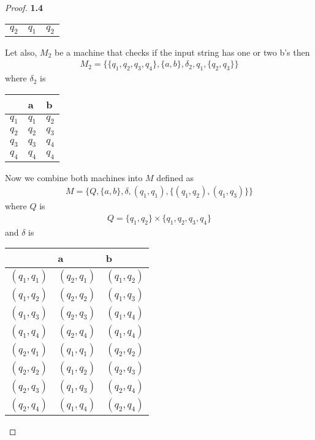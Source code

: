 \documentclass[11pt]{article}
\theoremstyle{definition}
\begin{document}
\begin{proof}{\textbf{1.4}}
\begin{itemize}
\begin{center}
\begin{tabular}{l|ll}
            $q_2$ & $q_1$ & $q_2$ \\
        \end{tabular}
        \end{center}
        Let also, $M_2$ be a machine that checks if the input string has
        one or two b's then
        \begin{align*}
            M_2 = \{\{q_1, q_2, q_3, q_4\}, \{a,b\}, \delta_2, q_1, \{q_2, q_3\}\}
        \end{align*}
        where $\delta_2$ is 
        \begin{center}
        \begin{tabular}{l|ll}
                  & a     & b     \\ \hline
            $q_1$ & $q_1$ & $q_2$ \\
            $q_2$ & $q_2$ & $q_3$ \\
            $q_3$ & $q_3$ & $q_4$ \\
            $q_4$ & $q_4$ & $q_4$ \\
        \end{tabular}
        \end{center}
        Now we combine both machines into $M$ defined as
        \begin{align*}
            M = \{Q, \{a,b\}, \delta, (q_1,q_1), \{(q_1, q_2), (q_1, q_3)\}\}
        \end{align*}
        where $Q$ is 
        \begin{align*}
            Q =\{q_1, q_2\} \times \{q_1, q_2, q_3, q_4\}
        \end{align*}
        and $\delta$ is 
        \begin{center}
        \begin{tabular}{l|ll}
                  & a     & b     \\ \hline
            $(q_1, q_1)$ & $(q_2, q_1)$ & $(q_1, q_2)$ \\
            $(q_1, q_2)$ & $(q_2, q_2)$ & $(q_1, q_3)$ \\
            $(q_1, q_3)$ & $(q_2, q_3)$ & $(q_1, q_4)$ \\
            $(q_1, q_4)$ & $(q_2, q_4)$ & $(q_1, q_4)$ \\
            $(q_2, q_1)$ & $(q_1, q_1)$ & $(q_2, q_2)$ \\
            $(q_2, q_2)$ & $(q_1, q_2)$ & $(q_2, q_3)$ \\
            $(q_2, q_3)$ & $(q_1, q_3)$ & $(q_2, q_4)$ \\
            $(q_2, q_4)$ & $(q_1, q_4)$ & $(q_2, q_4)$ \\

\end{tabular}
\end{center}
\end{itemize}
\end{proof}
\end{document}

